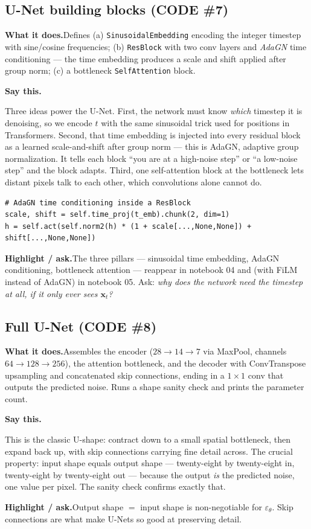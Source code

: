 \documentclass[11pt]{article}
\newenvironment{saythis}{%
  \par\smallskip\noindent
  \begin{list}{}{%
    \setlength{\leftmargin}{1.2em}%
    \setlength{\rightmargin}{0.5em}%
    \setlength{\topsep}{2pt}%
  }\item\relax
  \color{sayrule}\textbf{Say this.}\hspace{0.4em}\color{black}\itshape
}{%
  \end{list}\par\smallskip
}
\newcommand{\highlight}[1]{\par\smallskip\noindent\textcolor{hlcolor}{\textbf{Highlight / ask.}}\hspace{0.4em}#1\par\smallskip}
\newcommand{\whatdoes}[1]{\par\noindent\textbf{What it does.}\hspace{0.4em}#1\par}
\begin{document}
\subsection{U-Net building blocks (CODE \#7)}
\whatdoes{Defines (a) \texttt{SinusoidalEmbedding} encoding the integer timestep with sine/cosine
frequencies; (b) \texttt{ResBlock} with two conv layers and \emph{AdaGN} time conditioning --- the time
embedding produces a scale and shift applied after group norm; (c) a bottleneck \texttt{SelfAttention}
block.}
\begin{saythis}
Three ideas power the U-Net. First, the network must know \emph{which} timestep it is denoising, so we
encode $t$ with the same sinusoidal trick used for positions in Transformers. Second, that time
embedding is injected into every residual block as a learned scale-and-shift after group norm --- this
is AdaGN, adaptive group normalization. It tells each block ``you are at a high-noise step'' or ``a
low-noise step'' and the block adapts. Third, one self-attention block at the bottleneck lets distant
pixels talk to each other, which convolutions alone cannot do.
\end{saythis}
\begin{lstlisting}
# AdaGN time conditioning inside a ResBlock
scale, shift = self.time_proj(t_emb).chunk(2, dim=1)
h = self.act(self.norm2(h) * (1 + scale[...,None,None]) + shift[...,None,None])
\end{lstlisting}
\highlight{The three pillars --- sinusoidal time embedding, AdaGN conditioning, bottleneck attention ---
reappear in notebook 04 and (with FiLM instead of AdaGN) in notebook 05. Ask: \emph{why does the
network need the timestep at all, if it only ever sees $\mathbf{x}_t$?}}

\subsection{Full U-Net (CODE \#8)}
\whatdoes{Assembles the encoder ($28\to14\to7$ via MaxPool, channels $64\to128\to256$), the
attention bottleneck, and the decoder with ConvTranspose upsampling and concatenated skip connections,
ending in a $1\times1$ conv that outputs the predicted noise. Runs a shape sanity check and prints the
parameter count.}
\begin{saythis}
This is the classic U-shape: contract down to a small spatial bottleneck, then expand back up, with skip
connections carrying fine detail across. The crucial property: input shape equals output shape ---
twenty-eight by twenty-eight in, twenty-eight by twenty-eight out --- because the output \emph{is} the
predicted noise, one value per pixel. The sanity check confirms exactly that.
\end{saythis}
\highlight{Output shape $=$ input shape is non-negotiable for $\varepsilon_\theta$. Skip connections are
what make U-Nets so good at preserving detail.}
\end{document}
